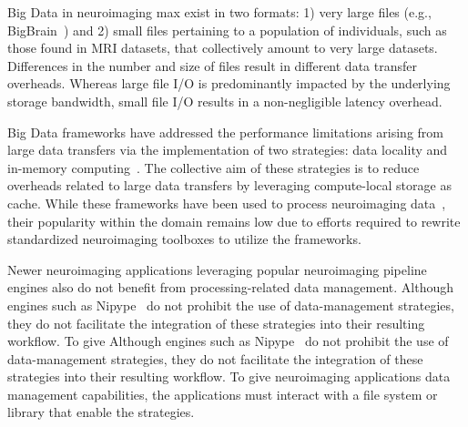 \documentclass[fleqn,10pt]{wlscirep}
\newcommand{\TG}[1]{\todo[color=green!60!black]{\textbf{\textsc{From Tristan:}} #1\xspace}}
\begin{document}
    Big Data in neuroimaging max exist in two formats: 1) very large files
    (e.g., BigBrain~\cite{amunts2013bigbrain}) and 2) small files pertaining to a
    population of individuals, such as those found in MRI datasets, that
    collectively amount to very large datasets. Differences in the number and
    size of files result in different data transfer overheads. Whereas large
    file I/O is predominantly impacted by the underlying storage bandwidth,
    small file I/O results in a non-negligible latency overhead. 

    Big Data frameworks have addressed the performance limitations arising from large data transfers via the
    implementation of two strategies: data locality and in-memory computing~\cite{zaharia2016apache, rocklin2015dask}.
    The collective aim of these strategies is to reduce overheads related to large data
    transfers by leveraging compute-local storage as cache.
    While these frameworks have been used
    to process neuroimaging data~\cite{rokem2021pan,thunder,boubela2016big},
    their popularity within the domain remains low due to efforts required to
    rewrite standardized neuroimaging toolboxes to utilize the frameworks.
    
    Newer neuroimaging applications leveraging popular neuroimaging pipeline engines
    also do not benefit from processing-related data management.
    Although engines such as Nipype~\cite{nipype}
    do not prohibit the use of data-management
    strategies, they do not facilitate the integration of these strategies into
    their resulting workflow. To give
    Although engines such as Nipype~\cite{nipype}
    do not prohibit the use of data-management
    strategies, they do not facilitate the integration of these strategies into
    their resulting workflow. To give
    neuroimaging applications data management capabilities, the applications
    must interact with a file system or library that enable the strategies.
\end{document}
